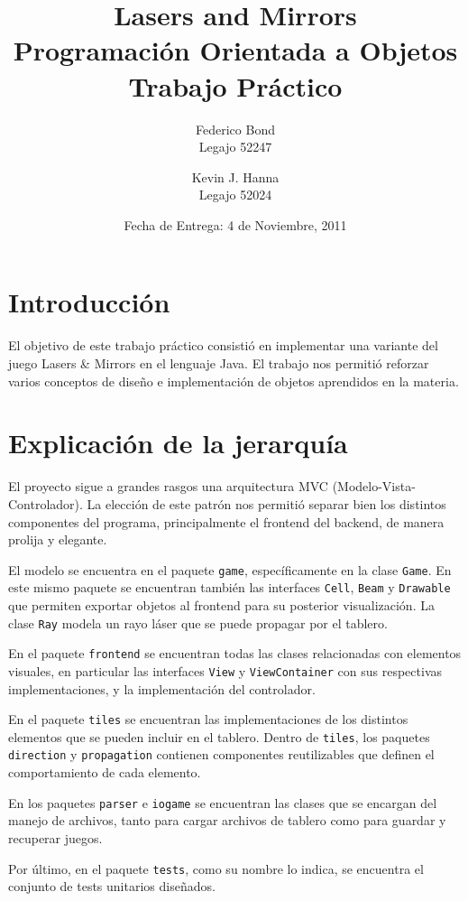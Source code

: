 \documentclass[a4paper, 11pt]{article}
\title{\Huge {Lasers and Mirrors} \\ Programación Orientada a Objetos\\[0.7cm] Trabajo Práctico}
\author{Federico Bond\\Legajo 52247 \and Kevin J. Hanna\\Legajo 52024}
\date{Fecha de Entrega: 4 de Noviembre, 2011}
\begin{document}
 

\maketitle

\newpage
\tableofcontents
\clearpage 

\section{Introducción}
El objetivo de este trabajo práctico consistió en implementar una variante del juego Lasers \& Mirrors en el lenguaje Java. El trabajo nos permitió reforzar varios conceptos de diseño e implementación de objetos aprendidos en la materia.

\section{Explicación de la jerarquía}
El proyecto sigue a grandes rasgos una arquitectura MVC (Modelo-Vista-Controlador). La elección de este patrón nos permitió separar bien los distintos componentes del programa, principalmente el frontend del backend, de manera prolija y elegante.

El modelo se encuentra en el paquete \texttt{game}, específicamente en la clase \texttt{Game}. En este mismo paquete se encuentran también las interfaces \texttt{Cell}, \texttt{Beam} y \texttt{Drawable} que permiten exportar objetos al frontend para su posterior visualización. La clase \texttt{Ray} modela un rayo láser que se puede propagar por el tablero.

En el paquete \texttt{frontend} se encuentran todas las clases relacionadas con elementos visuales, en particular las interfaces \texttt{View} y \texttt{ViewContainer} con sus respectivas implementaciones, y la implementación del controlador.

En el paquete \texttt{tiles} se encuentran las implementaciones de los distintos elementos que se pueden incluir en el tablero. Dentro de \texttt{tiles}, los paquetes \texttt{direction} y \texttt{propagation} contienen componentes reutilizables que definen el comportamiento de cada elemento.

En los paquetes \texttt{parser} e \texttt{iogame} se encuentran las clases que se encargan del manejo de archivos, tanto para cargar archivos de tablero como para guardar y recuperar juegos.

Por último, en el paquete \texttt{tests}, como su nombre lo indica, se encuentra el conjunto de tests unitarios diseñados.
\end{document}
